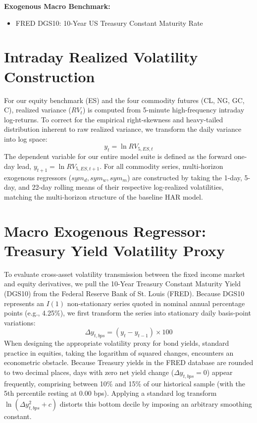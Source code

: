 \documentclass{report}
\begin{document}
\noindent \textbf{Exogenous Macro Benchmark:}
\begin{itemize}
    \item FRED DGS10: 10-Year US Treasury Constant Maturity Rate
\end{itemize}

\section{Intraday Realized Volatility Construction}
For our equity benchmark (ES) and the four commodity futures (CL, NG, GC, C), realized variance ($RV_t$) is computed from 5-minute high-frequency intraday log-returns. To correct for the empirical right-skewness and heavy-tailed distribution inherent to raw realized variance, we transform the daily variance into log space: 
\begin{equation}
y_t = \ln RV_{5, ES, t}
\end{equation}
The dependent variable for our entire model suite is defined as the forward one-day lead, $y_{t+1} = \ln RV_{5, ES, t+1}$. For all commodity series, multi-horizon exogenous regressors ($sym_d, sym_w, sym_m$) are constructed by taking the 1-day, 5-day, and 22-day rolling means of their respective log-realized volatilities, matching the multi-horizon structure of the baseline HAR model. 

\section{Macro Exogenous Regressor: Treasury Yield Volatility Proxy}
To evaluate cross-asset volatility transmission between the fixed income market and equity derivatives, we pull the 10-Year Treasury Constant Maturity Yield (DGS10) from the Federal Reserve Bank of St. Louis (FRED). Because DGS10 represents an $I(1)$ non-stationary series quoted in nominal annual percentage points (e.g., 4.25\%), we first transform the series into stationary daily basis-point variations: 
\begin{equation}
\Delta y_{t, bps} = (y_t - y_{t-1}) \times 100
\end{equation}
When designing the appropriate volatility proxy for bond yields, standard practice in equities, taking the logarithm of squared changes, encounters an econometric obstacle. Because Treasury yields in the FRED database are rounded to two decimal places, days with zero net yield change ($\Delta y_{t, bps} = 0$) appear frequently, comprising between 10\% and 15\% of our historical sample (with the 5th percentile resting at 0.00 bps). Applying a standard log transform $\ln(\Delta y_{t, bps}^2 + c)$ distorts this bottom decile by imposing an arbitrary smoothing constant. 
\end{document}
